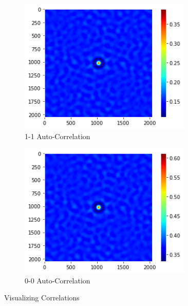 \documentclass[12pt, a4paper]{report}
\begin{document}
\begin{figure}[H]
\begin{subfigure}{.45\textwidth}
  \includegraphics[width=0.9\textwidth]{Pictures/2 Point/2_point_stats_ww.jpeg}
  \caption{1-1 Auto-Correlation}
  \label{img:microstrImg}
\end{subfigure}
\begin{subfigure}{.45\textwidth}
  \centering
  \includegraphics[width=0.9\textwidth]{Pictures/2 Point/2_point_stats_bb.jpeg}
  \caption{0-0 Auto-Correlation}
  \label{img:microstrImg}
\end{subfigure}


\caption{Visualizing Correlations}
\label{fig:test}
\end{figure}
\end{document}
